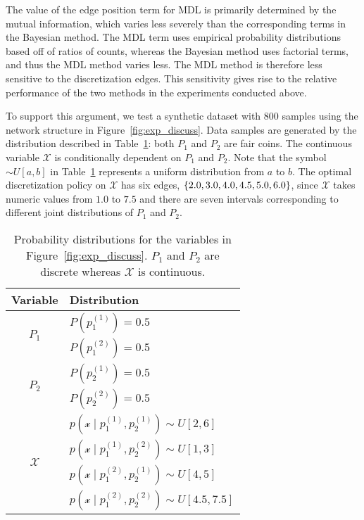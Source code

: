 \documentclass[twoside,11pt]{article}
\newcommand{\curly}[1]{\mathopen{}\mathclose\bgroup\left\{#1\aftergroup\egroup\right\}}
\newcommand{\cX}{\mathcal{X}} %
\newcommand{\cx}{\mathcal{x}} %
\begin{document}
The value of the edge position term for MDL is primarily determined by the mutual information, which varies less severely than the corresponding terms in the Bayesian method.
The MDL term uses empirical probability distributions based off of ratios of counts, whereas the Bayesian method uses factorial terms, and thus the MDL method varies less.
The MDL method is therefore less sensitive to the discretization edges.
This sensitivity gives rise to the relative performance of the two methods in the experiments conducted above.

To support this argument, we test a synthetic dataset with $800$ samples using the network structure in Figure~\ref{fig:exp_discuss}.
Data samples are generated by the distribution described in Table~\ref{table:distri_exp}: both $P_1$ and $P_2$ are fair coins.
The continuous variable $\cX$ is conditionally dependent on $P_1$ and $P_2$.
Note that the symbol $\sim U[a,b]$ in Table~\ref{table:distri_exp} represents a uniform distribution from $a$ to $b$.
The optimal discretization policy on $\cX$ has six edges, $\curly{2.0,3.0,4.0,4.5,5.0,6.0}$, since $\cX$ takes numeric values from $1.0$ to $7.5$ and there are seven intervals corresponding to different joint distributions of $P_1$ and $P_2$.

\begin{table}[ht]
	\centering
	\caption{Probability distributions for the variables in Figure~\ref{fig:exp_discuss}.
           $P_1$ and $P_2$ are discrete whereas $\cX$ is continuous.}
	\label{table:distri_exp}
	\begin{tabular}{cl}
		\toprule
		Variable               & Distribution                                   \\ \midrule
		\multirow{2}{*}{$P_1$}&$P(p^{(1)}_1) = 0.5$     \\
		                                       & $P(p^{(2)}_1) = 0.5$     \\ \midrule
		\multirow{2}{*}{$P_2$}&$P(p^{(1)}_2) = 0.5$     \\
		                                       &$P(p^{(2)}_2) = 0.5$     \\ \midrule
		\multirow{4}{*}{$\cX$} & $p(\cx \mid p^{(1)}_1,p^{(1)}_2) \sim U[2,6]$\\
		                                     & $p(\cx \mid p^{(1)}_1,p^{(2)}_2) \sim U[1,3]$ \\
		                                     & $p(\cx \mid p^{(2)}_1,p^{(1)}_2) \sim U[4,5]$ \\
		                                     & $p(\cx \mid p^{(2)}_1,p^{(2)}_2) \sim U[4.5,7.5]$\\
		\bottomrule
	\end{tabular}
\end{table}
\end{document}

